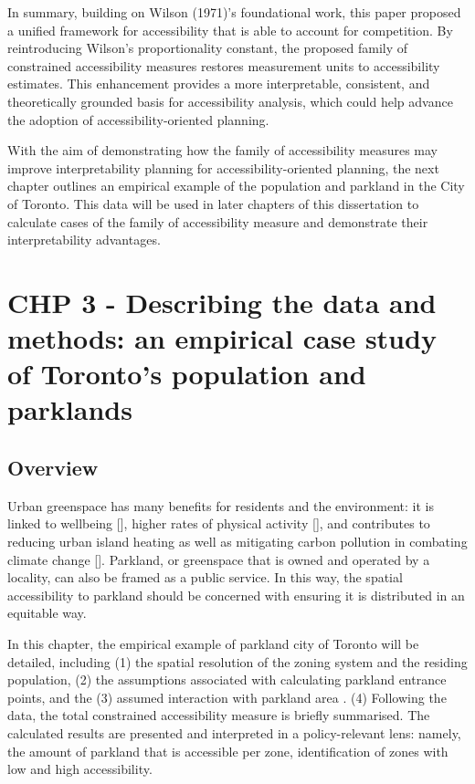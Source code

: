 \documentclass[
11pt, %
oneside, %
english, %
singlespacing, %
]{macthesis} %
\begin{document}
In summary, building on Wilson (1971)'s foundational work, this paper proposed a unified framework for accessibility that is able to account for competition. By reintroducing Wilson's proportionality constant, the proposed family of constrained accessibility measures restores measurement units to accessibility estimates. This enhancement provides a more interpretable, consistent, and theoretically grounded basis for accessibility analysis, which could help advance the adoption of accessibility-oriented planning.

With the aim of demonstrating how the family of accessibility measures may improve interpretability planning for accessibility-oriented planning, the next chapter outlines an empirical example of the population and parkland in the City of Toronto. This data will be used in later chapters of this dissertation to calculate cases of the family of accessibility measure and demonstrate their interpretability advantages.

\chapter{CHP 3 - Describing the data and methods: an empirical case study of Toronto's population and parklands}\label{chp-3---describing-the-data-and-methods-an-empirical-case-study-of-torontos-population-and-parklands}

\section{Overview}\label{overview}

Urban greenspace has many benefits for residents and the environment: it is linked to wellbeing {[}{]}, higher rates of physical activity {[}{]}, and contributes to reducing urban island heating as well as mitigating carbon pollution in combating climate change {[}{]}. Parkland, or greenspace that is owned and operated by a locality, can also be framed as a public service. In this way, the spatial accessibility to parkland should be concerned with ensuring it is distributed in an equitable way.

In this chapter, the empirical example of parkland city of Toronto will be detailed, including (1) the spatial resolution of the zoning system and the residing population, (2) the assumptions associated with calculating parkland entrance points, and the (3) assumed interaction with parkland area . (4) Following the data, the total constrained accessibility measure is briefly summarised. The calculated results are presented and interpreted in a policy-relevant lens: namely, the amount of parkland that is accessible per zone, identification of zones with low and high accessibility.
\end{document}
